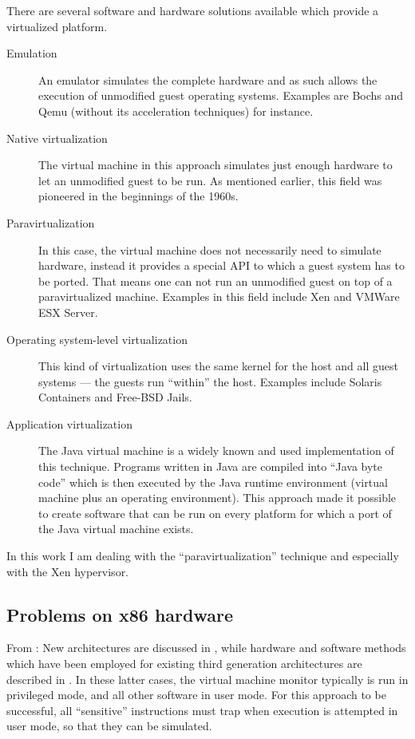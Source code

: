 There are several software  and hardware solutions available which provide
a  virtualized  platform.

\begin{description}
\item[Emulation] An  emulator simulates the complete hardware  and as such
  allows the execution of unmodified guest operating systems. Examples are
  Bochs and Qemu (without its acceleration techniques) for instance.
\item[Native vir\-tu\-ali\-za\-tion] The  virtual machine in this approach
  simulates just enough hardware to let  an unmodified guest to be run. As
  mentioned earlier,  this field  was pioneered in  the beginnings  of the
  1960s.
\item[Paravirtualization]  In  this case,  the  virtual  machine does  not
  necessarily need to simulate hardware, instead it provides a special API
  to which a guest system has to  be ported. That means one can not run an
  unmodified guest on  top of a paravirtualized machine.  Examples in this
  field include Xen and VMWare ESX Server.
\item[Operating system-level  virtualization] This kind  of virtualization
  uses the same  kernel for the host and all guest  systems --- the guests
  run  ``within''  the  host.   Examples include  Solaris  Containers  and
  Free-BSD Jails.
\item[Application  virtualization] The  Java virtual  machine is  a widely
  known  and used implementation  of this  technique. Programs  written in
  Java are compiled into ``Java byte  code'' which is then executed by the
  Java   runtime   environment   (virtual   machine  plus   an   operating
  environment).  This  approach made it  possible to create  software that
  can  be run  on every  platform for  which a  port of  the  Java virtual
  machine exists.
\end{description}

In this  work I am  dealing with the ``paravirtualization''  technique and
especially with the Xen hypervisor.

\subsection{Problems on x86 hardware}
\label{sec:x86-problems}
\nocite{robin00analysis}

From \cite{popek75}: New architectures are discussed in \cite{goldberg73},
while hardware and software methods  which have been employed for existing
third generation  architectures are described in  \cite{buzen73}. In these
latter cases, the  virtual machine monitor typically is  run in privileged
mode,  and all  other  software in  user  mode. For  this  approach to  be
successful,  all ``sensitive''  instructions must  trap when  execution is
attempted in user mode, so that they can be simulated.





